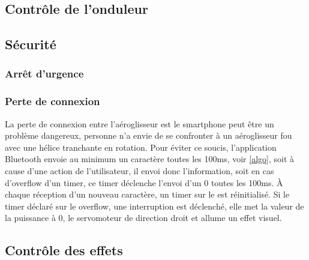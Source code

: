 			\subsection{Contrôle de l'onduleur}
			
			\subsection{Sécurité}
			
				\subsubsection{Arrêt d'urgence}\label{secu}
				
				\subsubsection{Perte de connexion}
				La perte de connexion entre l'aéroglisseur est le smartphone peut être un problème dangereux, personne n'a envie de se confronter à un aéroglisseur fou avec une hélice tranchante en rotation. Pour éviter ce soucis, l'application Bluetooth envoie au minimum un caractère toutes les 100ms, voir \ref{algo}, soit à cause d'une action de l'utilisateur, il envoi donc l'information, soit en cas d'overflow d'un timer, ce timer déclenche l'envoi d'un 0 toutes les 100ms. À chaque réception d'un nouveau caractère, un timer sur le \pic est réinitialisé. Si le timer déclaré sur le \pic overflow, une interruption est déclenché, elle met la valeur de la puissance à 0, le servomoteur de direction droit et allume un effet visuel.
				
				
			\subsection{Contrôle des effets}